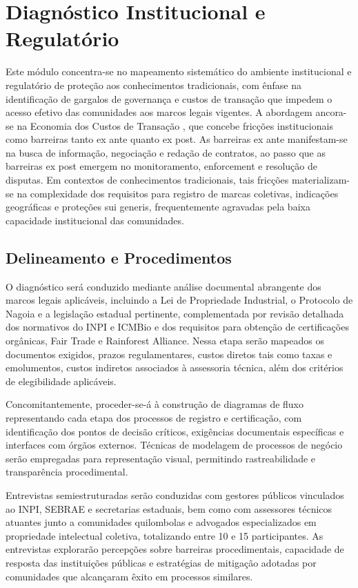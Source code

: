 \section{Diagnóstico Institucional e Regulatório}

Este módulo concentra-se no mapeamento sistemático do ambiente institucional e regulatório de proteção aos conhecimentos tradicionais, com ênfase na identificação de gargalos de governança e custos de transação que impedem o acesso efetivo das comunidades aos marcos legais vigentes. A abordagem ancora-se na Economia dos Custos de Transação \cite{Williamson1985}, que concebe fricções institucionais como barreiras tanto ex ante quanto ex post. As barreiras ex ante manifestam-se na busca de informação, negociação e redação de contratos, ao passo que as barreiras ex post emergem no monitoramento, enforcement e resolução de disputas. Em contextos de conhecimentos tradicionais, tais fricções materializam-se na complexidade dos requisitos para registro de marcas coletivas, indicações geográficas e proteções sui generis, frequentemente agravadas pela baixa capacidade institucional das comunidades.

\subsection{Delineamento e Procedimentos}

O diagnóstico será conduzido mediante análise documental abrangente dos marcos legais aplicáveis, incluindo a Lei de Propriedade Industrial, o Protocolo de Nagoia e a legislação estadual pertinente, complementada por revisão detalhada dos normativos do INPI e ICMBio e dos requisitos para obtenção de certificações orgânicas, Fair Trade e Rainforest Alliance. Nessa etapa serão mapeados os documentos exigidos, prazos regulamentares, custos diretos tais como taxas e emolumentos, custos indiretos associados à assessoria técnica, além dos critérios de elegibilidade aplicáveis.

Concomitantemente, proceder-se-á à construção de diagramas de fluxo representando cada etapa dos processos de registro e certificação, com identificação dos pontos de decisão críticos, exigências documentais específicas e interfaces com órgãos externos. Técnicas de modelagem de processos de negócio serão empregadas para representação visual, permitindo rastreabilidade e transparência procedimental.

Entrevistas semiestruturadas serão conduzidas com gestores públicos vinculados ao INPI, SEBRAE e secretarias estaduais, bem como com assessores técnicos atuantes junto a comunidades quilombolas e advogados especializados em propriedade intelectual coletiva, totalizando entre 10 e 15 participantes. As entrevistas explorarão percepções sobre barreiras procedimentais, capacidade de resposta das instituições públicas e estratégias de mitigação adotadas por comunidades que alcançaram êxito em processos similares.

